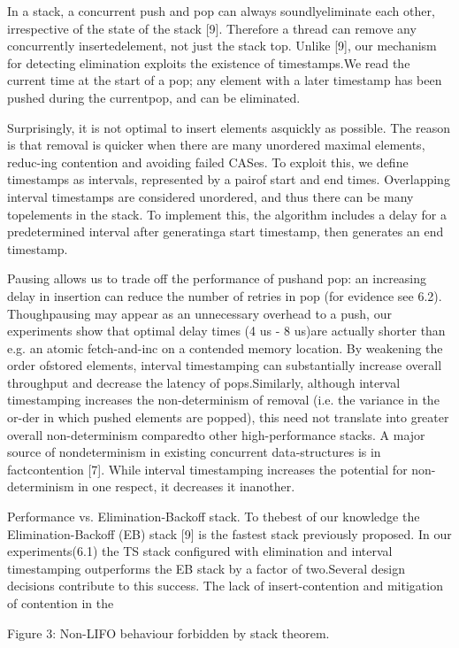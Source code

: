 In a stack, a concurrent push and pop can always soundlyeliminate each other, irrespective of the state of the stack [9].
Therefore a thread can remove any concurrently insertedelement, not just the stack top. Unlike [9], our mechanism for
detecting elimination exploits the existence of timestamps.We read the current time at the start of a pop; any element
with a later timestamp has been pushed during the currentpop, and can be eliminated.

Surprisingly, it is not optimal to insert elements asquickly as possible. The reason is that removal is quicker
when there are many unordered maximal elements, reduc-ing contention and avoiding failed CASes. To exploit this,
we define timestamps as intervals, represented by a pairof start and end times. Overlapping interval timestamps
are considered unordered, and thus there can be many topelements in the stack. To implement this, the algorithm includes a delay for a predetermined interval after generatinga start timestamp, then generates an end timestamp.

Pausing allows us to trade off the performance of pushand pop: an increasing delay in insertion can reduce the
number of retries in pop (for evidence see 6.2). Thoughpausing may appear as an unnecessary overhead to a push,
our experiments show that optimal delay times (4 us - 8 us)are actually shorter than e.g. an atomic fetch-and-inc on
a contended memory location. By weakening the order ofstored elements, interval timestamping can substantially
increase overall throughput and decrease the latency of pops.Similarly, although interval timestamping increases the
non-determinism of removal (i.e. the variance in the or-der in which pushed elements are popped), this need not
translate into greater overall non-determinism comparedto other high-performance stacks. A major source of nondeterminism in existing concurrent data-structures is in factcontention [7]. While interval timestamping increases the potential for non-determinism in one respect, it decreases it inanother.

Performance vs. Elimination-Backoff stack. To thebest of our knowledge the Elimination-Backoff (EB) stack [9]
is the fastest stack previously proposed. In our experiments(6.1) the TS stack configured with elimination and interval
timestamping outperforms the EB stack by a factor of two.Several design decisions contribute to this success. The lack
of insert-contention and mitigation of contention in the

Figure 3: Non-LIFO behaviour forbidden by stack theorem.

